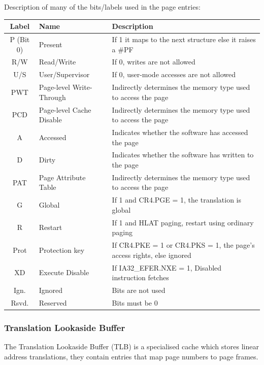 \documentclass{article}
\newcommand{\layout}[1]{\parbox{\linewidth}{#1}}
\begin{document}
\layout{
  Description of many of the bits/labels used in the page entries:
  \begin{table}[H]
    \centering
    \begin{tabular}{|c|l|l|}
      \hline \textbf{Label} & \textbf{Name} & \textbf{Description} \\ \hline
      P (Bit 0) & Present & If 1 it maps to the next structure else it raises a \#PF \\
      R/W & Read/Write & If 0, writes are not allowed \\
      U/S & User/Supervisor & If 0, user-mode accesses are not allowed \\
      PWT & Page-level Write-Through & Indirectly determines the memory type used to access the page \\
      PCD & Page-level Cache Disable & Indirectly determines the memory type used to access the page \\
      A & Accessed & Indicates whether the software has accessed the page \\
      D & Dirty & Indicates whether the software has written to the page \\
      PAT & Page Attribute Table & Indirectly determines the memory type used to access the page \\
      G & Global & If 1 and CR4.PGE = 1, the translation is global \\
      R & Restart & If 1 and HLAT paging, restart using ordinary paging \\
      Prot & Protection key & If CR4.PKE = 1 or CR4.PKS = 1, the page's access rights, else ignored \\
      XD & Execute Disable & If IA32\_EFER.NXE = 1, Disabled instruction fetches \\
      Ign. & Ignored & Bits are not used \\
      Rsvd. & Reserved & Bits must be 0 \\ \hline
    \end{tabular}
  \end{table}

  \cite[Chapter~5.3]{sdm3} \cite[Chapter~5.4]{sdm3} \cite[Chapter~5.5]{sdm3}
}

\layout{
  \subsubsection{Translation Lookaside Buffer}

  The Translation Lookaside Buffer (TLB) is a specialised cache which stores linear address translations, they contain entries that map page numbers to page frames.
  \cite[Chapter~5.10.2]{sdm3}
} \bigskip
\end{document}
